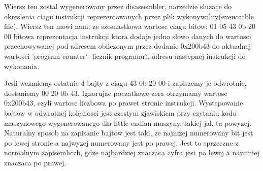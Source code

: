 \documentclass{article}
\begin{document}
Wiersz ten zostal wygenerowany przez disassembler, narzedzie sluzace do okreslenia ciagu instrukcji reprezentowanych przez plik wykonywalny(exeucatble file). 
Wiersz ten mowi nam, ze szesnastkowa wartosc ciagu bitow: 01 05 43 0b 20 00 bitowa reprezentacja instrukcji ktora dodaje jedno slowo danych do wartosci przechowywanej pod adresem obliczonym przez dodanie 0x200b43 do aktualnej wartosci 'program counter'- licznik programu?, adresu nastepnej instrukcji do wykonania. 

Jesli wezmiemy ostatnie 4 bajty z ciagu 43 0b 20 00 i zapiszemy je odwrotnie, dostaniemy 00 20 0b 43. Ignorujac poczatkowe zera otrzymamy wartosc 0x200b43, czyli wartosc liczbowa po prawet stronie instrukcji. 
Wystepowanie bajtow w odwrotnej kolejnosci jest czestym zjawiskiem przy czytaniu kodu maszynowego wygenerowanego dla little-endian maszyny, takiej jak ta powyzej. Naturalny sposob na zapisanie bajtow jest taki, ze najnizej numerowany bit jest po lewej stronie a najwyzej numerowany jest po prawej. Jest to sprzeczne z normalnym zapisemliczb, gdze najbardziej znaczaca cyfra jest po lewej a najmniej znaczaca po prawej.
\end{document}
